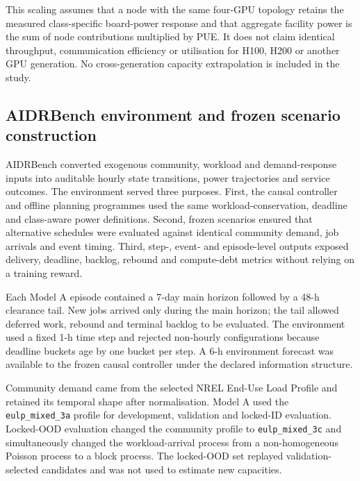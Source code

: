 \documentclass[10pt,a4paper]{article}
\begin{document}
This scaling assumes that a node with the same four-GPU topology retains the measured class-specific board-power response and that aggregate facility power is the sum of node contributions multiplied by PUE. It does not claim identical throughput, communication efficiency or utilisation for H100, H200 or another GPU generation. No cross-generation capacity extrapolation is included in the study.


\subsection{AIDRBench environment and frozen scenario construction}

AIDRBench converted exogenous community, workload and demand-response inputs into auditable hourly state transitions, power trajectories and service outcomes. The environment served three purposes. First, the causal controller and offline planning programmes used the same workload-conservation, deadline and class-aware power definitions. Second, frozen scenarios ensured that alternative schedules were evaluated against identical community demand, job arrivals and event timing. Third, step-, event- and episode-level outputs exposed delivery, deadline, backlog, rebound and compute-debt metrics without relying on a training reward.


Each Model A episode contained a 7-day main horizon followed by a 48-h clearance tail. New jobs arrived only during the main horizon; the tail allowed deferred work, rebound and terminal backlog to be evaluated. The environment used a fixed 1-h time step and rejected non-hourly configurations because deadline buckets age by one bucket per step. A 6-h environment forecast was available to the frozen causal controller under the declared information structure.


Community demand came from the selected NREL End-Use Load Profile and retained its temporal shape after normalisation. Model A used the \nolinkurl{eulp_mixed_3a} profile for development, validation and locked-ID evaluation. Locked-OOD evaluation changed the community profile to \nolinkurl{eulp_mixed_3c} and simultaneously changed the workload-arrival process from a non-homogeneous Poisson process to a block process. The locked-OOD set replayed validation-selected candidates and was not used to estimate new capacities.
\end{document}
